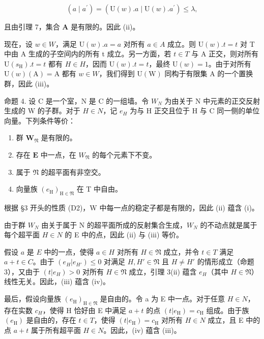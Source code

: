 \[
(a \mid a ^ {\prime}) = (\mathrm{U} (w). a \mid \mathrm{U} (w). a ^ {\prime}) \leqslant \lambda ,
\]

且由引理 7，集合 \(\mathbf{A}\) 是有限的。因此 (ii)。

现在，设 \(w \in W\)，满足 \(\mathrm{U}(w).a = a\) 对所有 \(a \in A\) 成立。则 \(\mathrm{U}(w).t = t\) 对 T 中由 A 生成的子空间内的所有 t 成立。另一方面，若 \(t \in T\) 与 A 正交，则对所有 \(\mathrm{U}(s_{\mathrm{H}}).t = t\) 都有 \(H \in H\)，因而 \(\mathrm{U}(w).t = t\)，最终 \(\mathrm{U}(w) = 1\)。由于对所有 \(\mathrm{U}(w)(\mathrm{A}) = \mathrm{A}\) 都有 \(w \in W\)，我们得到 \(\mathrm{U}(\mathrm{W})\) 同构于有限集 A 的一个置换群，因此 (iii)。

命题 4. 设 C 是一个室，N 是 C 的一组墙。令 \(W_{N}\) 为由关于 N 中元素的正交反射生成的 W 的子群。对于 \(H \in N\)，记 \(e_{H}\) 为与 H 正交且位于 H 与 C 同一侧的单位向量。下列条件等价：

\begin{enumerate}
\def\labelenumi{(\roman{enumi})}
\item
群 \(\mathbf{W}_{\mathfrak{N}}\) 是有限的。
\item
存在 \(\mathbf{E}\) 中一点，在 \(W_{\mathfrak{N}}\) 的每个元素下不变。
\item
属于 \(\mathfrak{N}\) 的超平面有非空交。
\item
向量族 \((e_{\mathrm{H}})_{\mathrm{H}\in \mathfrak{N}}\) 在 T 中自由。
\end{enumerate}

根据 §3 开头的性质 (D2)，W 中每一点的稳定子都是有限的，因此 (ii) 蕴含 (i)。

由于群 \(W_{N}\) 由关于属于 N 的超平面所成的反射集合生成，\(W_{N}\) 的不动点就是属于每个超平面 \(H \in N\) 的 E 中的点，因此 (ii) 与 (iii) 等价。

假设 \(a\) 是 \(E\) 中的一点，使得 \(a \in H\) 对所有 \(H \in \mathfrak{N}\) 成立，并令 \(t \in T\) 满足 \(a + t \in C\)。由于 \((e_H | e_{H'}) \leqslant 0\) 对满足 \(H, H' \in \mathfrak{N}\) 且 \(H \neq H'\) 的情形成立（命题 3），又由于 \((t | e_H) > 0\) 对所有 \(H \in \mathfrak{N}\) 成立，引理 3(ii) 蕴含 \(e_H\)（其中 \(H \in \mathfrak{N}\)）线性无关。因此，(iii) 蕴含 (iv)。

最后，假设向量族 \((e_{\mathrm{H}})_{\mathrm{H}\in\mathfrak{N}}\) 是自由的。令 a 为 E 中一点。对于任意 \(H\in N\)，存在实数 \(c_{H}\)，使得 H 恰好由 E 中满足 \(a+t\) 的点 \((t|e_{\mathrm{H}})=c_{\mathrm{H}}\) 组成。由于族 \((e_{\mathrm{H}})\) 是自由的，存在 \(t\in T\)，使得 \((t|e_{\mathrm{H}})=c_{\mathrm{H}}\) 对所有 \(H\in N\) 成立，且 E 中的点 \(a+t\) 属于所有超平面 \(H\in N\)。因此，(iv) 蕴含 (iii)。

